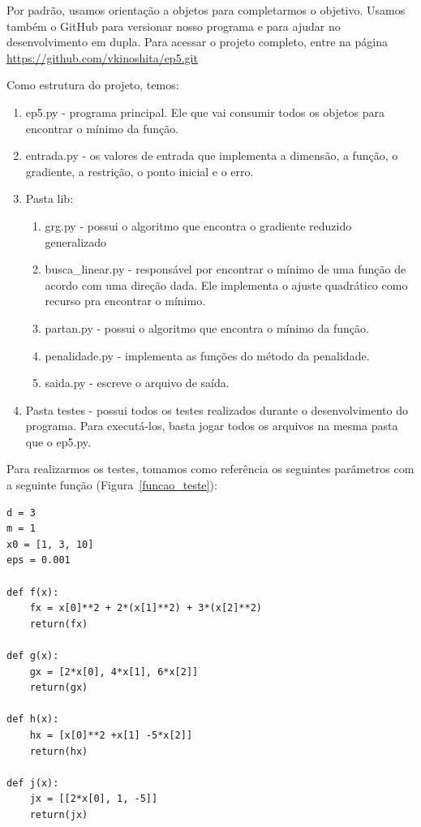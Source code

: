 \documentclass[12pt]{article}
\begin{document}
Por padrão, usamos orientação a objetos para completarmos o objetivo. Usamos também o GitHub para versionar nosso programa e para ajudar no desenvolvimento em dupla. Para acessar o projeto completo, entre na página \url{https://github.com/vkinoshita/ep5.git}

Como estrutura do projeto, temos:

\begin{enumerate}
	\item ep5.py - programa principal. Ele que vai consumir todos os objetos para encontrar o mínimo da função.
	\item entrada.py - os valores de entrada que implementa a dimensão, a função, o gradiente, a restrição, o ponto inicial e o erro. 
	\item Pasta lib:
	\begin{enumerate}
		\item grg.py - possui o algoritmo que encontra o gradiente reduzido generalizado
		\item busca\_linear.py - responsável por encontrar o mínimo de uma função de acordo com uma direção dada. Ele implementa o ajuste quadrático como recurso pra encontrar o mínimo.
		\item partan.py - possui o algoritmo que encontra o mínimo da função.
		\item penalidade.py - implementa as funções do método da penalidade.
		\item saida.py - escreve o arquivo de saída.
	\end{enumerate}
	\item Pasta testes - possui todos os testes realizados durante o desenvolvimento do programa. Para executá-los, basta jogar todos os arquivos na mesma pasta que o ep5.py.
\end{enumerate}

Para realizarmos os testes, tomamos como referência os seguintes parâmetros com a seguinte função (Figura~\ref{funcao_teste}):

\begin{verbatim}
d = 3
m = 1
x0 = [1, 3, 10]
eps = 0.001

def f(x):
	fx = x[0]**2 + 2*(x[1]**2) + 3*(x[2]**2)
	return(fx)

def g(x):
	gx = [2*x[0], 4*x[1], 6*x[2]]
	return(gx)

def h(x):
	hx = [x[0]**2 +x[1] -5*x[2]]
	return(hx)

def j(x):
	jx = [[2*x[0], 1, -5]]
	return(jx)
\end{verbatim}
\end{document}
